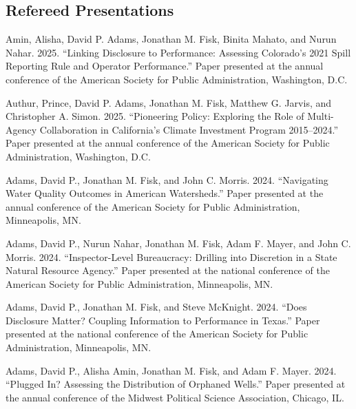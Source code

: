 \documentclass[12pt,letterpaper]{article}
\renewenvironment{itemize}{
  \begin{list}{}{
    \setlength{\leftmargin}{1.5em}
    \setlength{\itemsep}{0.25em}
    \setlength{\parskip}{0pt}
    \setlength{\parsep}{0.25em}
  }
}{
  \end{list}
}
\begin{document}
\subsection*{Refereed Presentations}
	\begin{itemize}\leftmargin=2pt\itemindent=-15pt\leftmargin=2pt\itemindent=-15pt

    \item Amin, Alisha, David P. Adams, Jonathan M. Fisk, Binita Mahato, and Nurun Nahar. 2025. ``Linking Disclosure to Performance: Assessing Colorado's 2021 Spill Reporting Rule and Operator Performance.'' Paper presented at the annual conference of the American Society for Public Administration, Washington, D.C.

    \item Authur, Prince, David P. Adams, Jonathan M. Fisk, Matthew G. Jarvis, and Christopher A. Simon. 2025. ``Pioneering Policy: Exploring the Role of Multi-Agency Collaboration in California's Climate Investment Program 2015--2024.'' Paper presented at the annual conference of the American Society for Public Administration, Washington, D.C.
    
    \item Adams, David P., Jonathan M. Fisk, and John C. Morris. 2024. ``Navigating Water Quality Outcomes in American Watersheds.'' Paper presented at the annual conference of the American Society for Public Administration, Minneapolis, MN.
    
    \item Adams, David P., Nurun Nahar, Jonathan M. Fisk, Adam F. Mayer, and John C. Morris. 2024. ``Inspector-Level Bureaucracy: Drilling into Discretion in a State Natural Resource Agency.'' Paper presented at the national conference of the American Society for Public Administration, Minneapolis, MN.
    
    \item Adams, David P., Jonathan M. Fisk, and Steve McKnight. 2024. ``Does Disclosure Matter? Coupling Information to Performance in Texas.'' Paper presented at the national conference of the American Society for Public Administration, Minneapolis, MN.
    
    \item Adams, David P., Alisha Amin, Jonathan M. Fisk, and Adam F. Mayer. 2024. ``Plugged In? Assessing the Distribution of Orphaned Wells.'' Paper presented at the annual conference of the Midwest Political Science Association, Chicago, IL.


\end{itemize}
\end{document}
